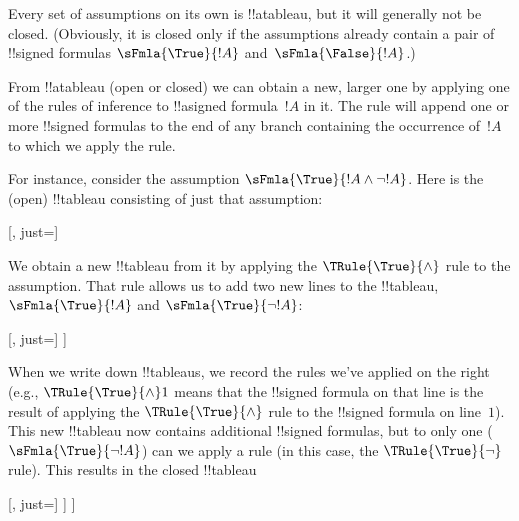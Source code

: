 \begin{ex}
  Every set of assumptions on its own is !!a{tableau}, but it will
  generally not be closed. (Obviously, it is closed only if the
  assumptions already contain a pair of !!{signed formula}s
  $\sFmla{\True}{!A}$ and~$\sFmla{\False}{!A}$.)

  From !!a{tableau} (open or closed) we can obtain a new, larger one by
  applying one of the rules of inference to !!a{signed formula}~$!A$
  in it. The rule will append one or more !!{signed formula}s to the end of
  any branch containing the occurrence of~$!A$ to which we apply the
  rule.

  For instance, consider the assumption $\sFmla{\True}{!A \land \lnot
    !A}$. Here is the (open) !!{tableau} consisting of just that
  assumption:
  \begin{center}
    \begin{tableau}{}
      [, just=\TAss]
    \end{tableau}{}
  \end{center}
  We obtain a new !!{tableau} from it by applying the $\TRule{\True}{\land}$
  rule to the assumption. That rule allows us to add two new lines to
  the !!{tableau}, $\sFmla{\True}{!A}$ and $\sFmla{\True}{\lnot !A}$:
  \begin{center}
    \begin{tableau}{}
      [, just=\TAss
        [\sFmla{\True}{\formula{A}}, just={\TRule{\True}{\land}[1]},
          [\sFmla{\True}{\lnot \formula{A}}, just={\TRule{\True}{\land}[1]}
          ]
        ]
      ]
    \end{tableau}{}
  \end{center}
  When we write down !!{tableau}s, we record the rules we've applied
  on the right (e.g., $\TRule{\True}{\land} 1$ means that the
  !!{signed formula} on that line is the result of applying the
  $\TRule{\True}{\land}$ rule to the !!{signed formula} on line~$1$).
  This new !!{tableau} now contains additional !!{signed formula}s,
  but to only one ($\sFmla{\True}{\lnot !A}$) can we apply a rule (in
  this case, the $\TRule{\True}{\lnot}$ rule). This results in the closed
  !!{tableau}
  \begin{center}
    \begin{tableau}{}
      [, just=\TAss
        [\sFmla{\True}{\formula{A}}, just={\TRule{\True}{\land}[1]}
          [\sFmla{\True}{\lnot \formula{A}}, just={\TRule{\True}{\land}[1]}
            [\sFmla{\False}{\formula{A}}, just={\TRule{\True}{\lnot}[3]}, close]
          ]
        ]
      ]
    \end{tableau}{}
  \end{center}
\end{ex}






